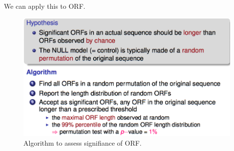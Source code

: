 We can apply this to ORF.


\begin{figure}[htp]
	\centering
	\includegraphics[scale=0.4]{images/08_orf.png}
 	\caption{Algorithm to assess signifiance of ORF.}
\end{figure}